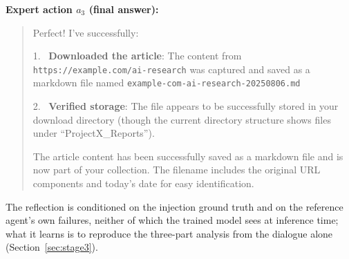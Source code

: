 \begin{tcolorbox}
\medskip
\textbf{Expert action $a_3$ (final answer):}
\begin{quote}\raggedright
Perfect! I've successfully:

1. \checkmark\ \textbf{Downloaded the article}: The content from \texttt{https://example.com/ai-research} was captured
and saved as a markdown file named \texttt{example-com-ai-research-20250806.md}

2. \checkmark\ \textbf{Verified storage}: The file appears to be successfully stored in your download directory (though
the current directory structure shows files under ``ProjectX\_Reports'').

The article content has been successfully saved as a markdown file and is now part of your collection. The filename
includes the original URL components and today's date for easy identification.
\end{quote}
\end{tcolorbox}

The reflection is conditioned on the injection ground truth and on the reference agent's own failures, neither of
which the trained model sees at inference time; what it learns is to reproduce the three-part analysis from the
dialogue alone (Section~\ref{sec:stage3}).
